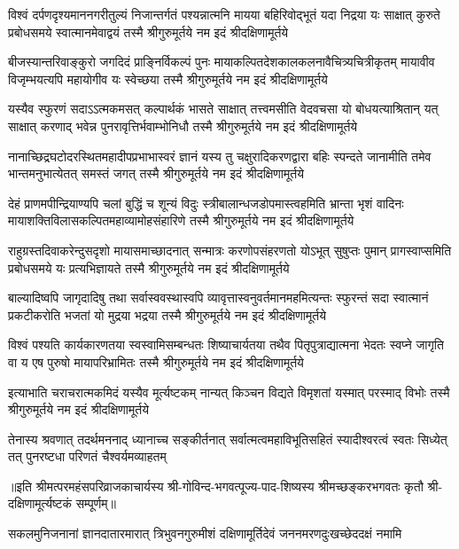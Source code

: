 

\fourlineindentedshloka
{विश्वं दर्पणदृश्यमाननगरीतुल्यं निजान्तर्गतं}
{पश्यन्नात्मनि मायया बहिरिवोद्भूतं यदा निद्रया}
{यः साक्षात् कुरुते प्रबोधसमये स्वात्मानमेवाद्वयं}
{तस्मै श्रीगुरुमूर्तये नम इदं श्रीदक्षिणामूर्तये}

\fourlineindentedshloka
{बीजस्यान्तरिवाङ्कुरो जगदिदं प्राङ्\mbox{}निर्विकल्पं पुनः}
{मायाकल्पितदेशकालकलनावैचित्र्यचित्रीकृतम्}
{मायावीव विजृम्भयत्यपि महायोगीव यः स्वेच्छया}
{तस्मै श्रीगुरुमूर्तये नम इदं श्रीदक्षिणामूर्तये}

\fourlineindentedshloka
{यस्यैव स्फुरणं सदाऽऽत्मकमसत् कल्पार्थकं भासते}
{साक्षात् तत्त्वमसीति वेदवचसा यो बोधयत्याश्रितान्}
{यत् साक्षात् करणाद् भवेन्न पुनरावृत्तिर्भवाम्भोनिधौ}
{तस्मै श्रीगुरुमूर्तये नम इदं श्रीदक्षिणामूर्तये}

\fourlineindentedshloka
{नानाच्छिद्रघटोदरस्थितमहादीपप्रभाभास्वरं}
{ज्ञानं यस्य तु चक्षुरादिकरणद्वारा बहिः स्पन्दते}
{जानामीति तमेव भान्तमनुभात्येतत् समस्तं जगत्}
{तस्मै श्रीगुरुमूर्तये नम इदं श्रीदक्षिणामूर्तये}

\fourlineindentedshloka
{देहं प्राणमपीन्द्रियाण्यपि चलां बुद्धिं च शून्यं विदुः}
{स्त्रीबालान्धजडोपमास्त्वहमिति भ्रान्ता भृशं वादिनः}
{मायाशक्तिविलासकल्पितमहाव्यामोहसंहारिणे}
{तस्मै श्रीगुरुमूर्तये नम इदं श्रीदक्षिणामूर्तये}

\fourlineindentedshloka
{राहुग्रस्तदिवाकरेन्दुसदृशो मायासमाच्छादनात्}
{सन्मात्रः करणोपसंहरणतो योऽभूत् सुषुप्तः पुमान्}
{प्रागस्वाप्समिति प्रबोधसमये यः प्रत्यभिज्ञायते}
{तस्मै श्रीगुरुमूर्तये नम इदं श्रीदक्षिणामूर्तये}

\fourlineindentedshloka
{बाल्यादिष्वपि जागृदादिषु तथा सर्वास्ववस्थास्वपि}
{व्यावृत्तास्वनुवर्तमानमहमित्यन्तः स्फुरन्तं सदा}
{स्वात्मानं प्रकटीकरोति भजतां यो मुद्रया भद्रया}
{तस्मै श्रीगुरुमूर्तये नम इदं श्रीदक्षिणामूर्तये}

\fourlineindentedshloka
{विश्वं पश्यति कार्यकारणतया स्वस्वामिसम्बन्धतः}
{शिष्याचार्यतया तथैव पितृपुत्राद्यात्मना भेदतः}
{स्वप्ने जागृति वा य एष पुरुषो मायापरिभ्रामितः}
{तस्मै श्रीगुरुमूर्तये नम इदं श्रीदक्षिणामूर्तये}

{इत्याभाति चराचरात्मकमिदं यस्यैव मूर्त्यष्टकम्}
{नान्यत् किञ्चन विद्यते विमृशतां यस्मात् परस्माद् विभोः}
{तस्मै श्रीगुरुमूर्तये नम इदं श्रीदक्षिणामूर्तये}

{तेनास्य श्रवणात् तदर्थमननाद् ध्यानाच्च सङ्कीर्तनात्}
{सर्वात्मत्वमहाविभूतिसहितं स्यादीश्वरत्वं स्वतः}
{सिध्येत् तत् पुनरष्टधा परिणतं चैश्वर्यमव्याहतम्}

॥इति श्रीमत्परमहंसपरिव्राजकाचार्यस्य श्री-गोविन्द-भगवत्पूज्य-पाद-शिष्यस्य
श्रीमच्छङ्करभगवतः कृतौ श्री-दक्षिणामूर्त्यष्टकं सम्पूर्णम्॥

\closesub

{सकलमुनिजनानां ज्ञानदातारमारात्}
{त्रिभुवनगुरुमीशं दक्षिणामूर्तिदेवं}
{जननमरणदुःखच्छेददक्षं नमामि}